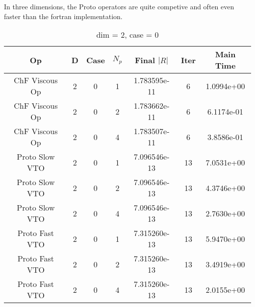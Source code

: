 \documentclass{article}
\begin{document}
In three dimensions, the Proto operators are quite competive and often
even faster than the fortran implementation.
\begin{small} 
  \begin{table}[p]
    \begin{center}
      \begin{tabular}{|c|c|c|c|c|c||c|} \hline
        Op & D & Case & $N_p$ & Final $|R|$  &  Iter & Main Time \\
        \hline
        
        ChF Viscous Op & 2 & 0 & 1& 1.783595e-11 & 6 & 1.0994e+00\\
        ChF Viscous Op & 2 & 0 & 2& 1.783662e-11 & 6 & 6.1174e-01\\
        ChF Viscous Op & 2 & 0 & 4& 1.783507e-11 & 6 & 3.8586e-01\\
        Proto Slow VTO & 2 & 0 & 1& 7.096546e-13 & 13 & 7.0531e+00\\
        Proto Slow VTO & 2 & 0 & 2& 7.096546e-13 & 13 & 4.3746e+00\\
        Proto Slow VTO & 2 & 0 & 4& 7.096546e-13 & 13 & 2.7630e+00\\
        Proto Fast VTO & 2 & 0 & 1& 7.315260e-13 & 13 & 5.9470e+00\\
        Proto Fast VTO & 2 & 0 & 2& 7.315260e-13 & 13 & 3.4919e+00\\
        Proto Fast VTO & 2 & 0 & 4& 7.315260e-13 & 13 & 2.0155e+00\\
        \hline
      \end{tabular} 
    \end{center}   
    \label{__dim_=_2__case_=_0} 
    \caption{dim = 2, case = 0} 
  \end{table} 
\end{small}
\end{document}
